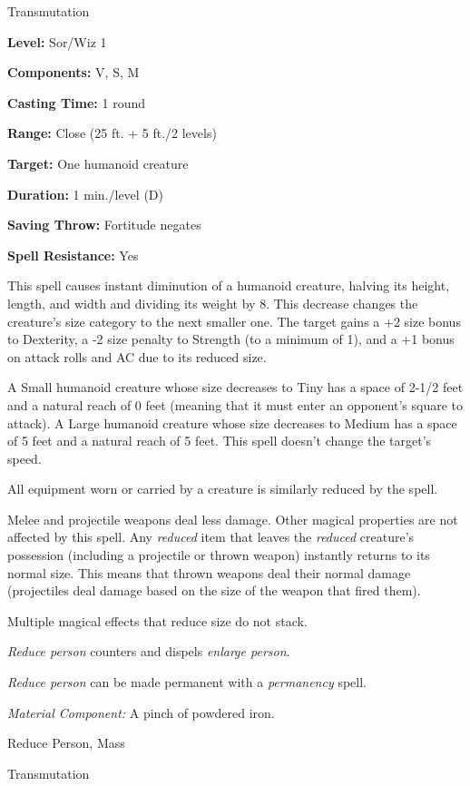 \documentclass{article}
\begin{document}
Transmutation

\textbf{Level:} Sor/Wiz 1

\textbf{Components:} V, S, M

\textbf{Casting Time:} 1 round

\textbf{Range:} Close (25 ft. + 5 ft./2 levels)

\textbf{Target:} One humanoid creature

\textbf{Duration:} 1 min./level (D)

\textbf{Saving Throw:} Fortitude negates

\textbf{Spell Resistance:} Yes

This spell causes instant diminution of a humanoid creature, halving its height, 
length, and width and dividing its weight by 8. This decrease changes the creature's 
size category to the next smaller one. The target gains a +2 size bonus to Dexterity, 
a -2 size penalty to Strength (to a minimum of 1), and a +1 bonus on attack rolls 
and AC due to its reduced size.

A Small humanoid creature whose size decreases to Tiny has a space of 2-1/2 feet 
and a natural reach of 0 feet (meaning that it must enter an opponent's square 
to attack). A Large humanoid creature whose size decreases to Medium has a space 
of 5 feet and a natural reach of 5 feet. This spell doesn't change the target's 
speed.

All equipment worn or carried by a creature is similarly reduced by the spell.

Melee and projectile weapons deal less damage. Other magical properties are not 
affected by this spell. Any \textit{reduced }item that leaves the \textit{reduced 
}creature's possession (including a projectile or thrown weapon) instantly returns 
to its normal size. This means that thrown weapons deal their normal damage (projectiles 
deal damage based on the size of the weapon that fired them).

Multiple magical effects that reduce size do not stack.

\textit{Reduce person }counters and dispels \textit{enlarge person}.

\textit{Reduce person }can be made permanent with a \textit{permanency }spell.

\textit{Material Component: }A pinch of powdered iron.

\vspace{12pt}
Reduce Person, Mass

Transmutation
\end{document}
